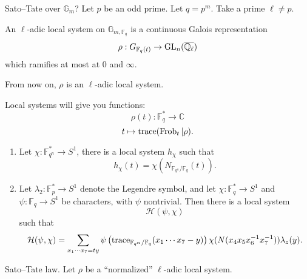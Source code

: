 \documentclass[reqno]{amsart} 
\begin{document}
Sato--Tate over $\mathbb{G}_m$?  Let $p$ be an odd prime.  Let $q = p^m$.  Take a prime $\ell \neq p$.
\begin{definition}
  An $\ell$-adic local system on $\mathbb{G}_{m,\mathbb{F}_q}$ is a continuous Galois representation
  \begin{equation*}
    \rho : G_{\mathbb{F}_q (t) } \rightarrow \operatorname{GL}_n( \overline{\mathbb{Q}_{\ell}})
  \end{equation*}
  which ramifies at most at $0$ and $\infty$.
\end{definition}
From now on, $\rho$ is an $\ell$-adic local system.
\begin{remark}
  Local systems will give you functions:
  \begin{equation*}
    \rho(t) : 
    \mathbb{F}_q^\ast \rightarrow \mathbb{C} 
  \end{equation*}
  \begin{equation*}
    t \mapsto
    \operatorname{trace} (\operatorname{Frob}_t | \rho ).
  \end{equation*}
\end{remark}
\begin{example}
  \begin{enumerate}
  \item Let $\chi : \mathbb{F}_{q^n }^\ast \rightarrow S^1$, there is a local system $h_\chi $ such that
    \begin{equation*}
      h_\chi (t) = \chi \left( N_{\mathbb{F}_{q^n } / \mathbb{F}_q } (t)  \right).
    \end{equation*}
  \item Let $\lambda_2 : \mathbb{F}_p^\ast \rightarrow S^1$ denote the Legendre symbol, and let $\chi : \mathbb{F}_q^\ast \rightarrow S^1$ and $\psi : \mathbb{F}_q \rightarrow S^1$ be characters, with $\psi$ nontrivial.  Then there is a local system
    \begin{equation*}
      \mathcal{H} (\psi, \chi )
    \end{equation*}
    such that
    \begin{equation*}
      \mathcal{H} (\psi, \chi ) = \sum_{x_1 \dotsb x_7 = t y}
      \psi \left( \operatorname{trace}_{\mathbb{F}_{q^n } / \mathbb{F}_q } (x_1 \dotsb x_7 - y) \right)
      \chi (N (x_4 x_5 x_6^{-1} x_7^{-1} ))
      \lambda_z (y).
    \end{equation*}
  \end{enumerate}
\end{example}

Sato--Tate law.  Let $\rho$ be a ``normalized'' $\ell$-adic local system.
\end{document}
